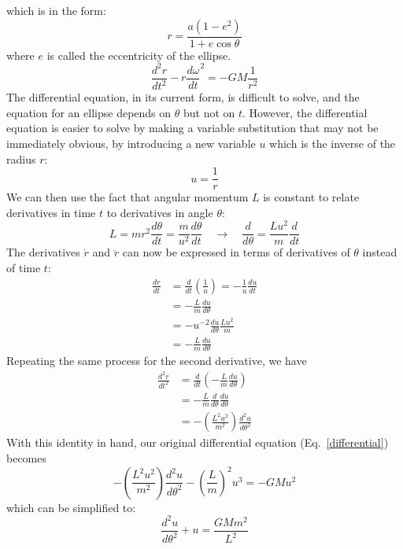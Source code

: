 \documentclass[11pt]{article}
\begin{document}
which is in the form:
\begin{equation}
  r=\frac{a(1-e^2)}{1+e\cos\theta}
\end{equation}
where $e$ is called the eccentricity of the ellipse.
\begin{equation}
  \frac{d^2r}{dt^2} - r\frac{d\omega}{dt}^2 = -GM\frac{1}{r^2}
  \label{differential}
\end{equation}
The differential equation, in its current form, is difficult to solve, and the
equation for an ellipse depends on $\theta$ but not on $t$. However, the
differential equation is easier to solve by making a variable substitution that
may not be immediately obvious, by introducing a new variable $u$ which is
the inverse of the radius $r$:
\begin{equation}
  u=\frac{1}{r}
\end{equation}
We can then use the fact that angular momentum $L$ is constant to relate
derivatives in time $t$ to derivatives in angle $\theta$:
\begin{equation}
  L=mr^2\frac{d\theta}{dt}=\frac{m}{u^2}\frac{d\theta}{dt}
  \quad\longrightarrow\quad
  \frac{d}{d\theta}=\frac{Lu^2}{m}\frac{d}{dt}
\end{equation}
The derivatives $\dot{r}$ and $\ddot{r}$ can now be expressed in terms of
derivatives of $\theta$ instead of time $t$:
\begin{align}
  \frac{dr}{dt} &=\frac{d}{dt}\left(\frac{1}{u}\right)
  =-\frac{1}{u}\frac{du}{dt}\\
  &=-\frac{L}{m}\frac{du}{d\theta}\\
  &= -u^{-2}\frac{du}{d\theta} \frac{Lu^2}{m} \\
  &= -\frac{L}{m}\frac{du}{d\theta}
\end{align}
Repeating the same process for the second derivative, we have
\begin{align}
  \frac{d^2r}{dt^2} &= \frac{d}{dt}\left(-\frac{L}{m}\frac{du}{d\theta}\right)\\
  &= -\frac{L}{m} \frac{d}{d\theta}\frac{du}{d\theta} \\
  &= -\left(\frac{L^2u^2}{m^2}\right)\frac{d^2u}{d\theta^2}
\end{align}
With this identity in hand, our original differential equation
(Eq.\ \ref{differential}) becomes
\begin{equation}
  -\left(\frac{L^2u^2}{m^2}\right)\frac{d^2u}{d\theta^2} - \left(\frac{L}{m}\right)^2u^3 = -GMu^2
\end{equation}
which can be simplified to:
\begin{equation}
  \frac{d^2u}{d\theta^2} + u = \frac{GMm^2}{L^2}
  \label{newdiff}
\end{equation}
\end{document}
